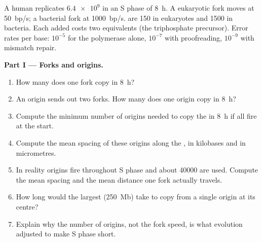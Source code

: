 \begin{problem}
\label{pb:b1:replication-mitosis:1}
A human  replicates $\num{6.4e9}$  in an S phase of
\qty{8}{h}. A eukaryotic fork moves at \qty{50}{bp/s}; a bacterial
fork at \qty{1000}{bp/s}.  are \qty{150}{}
 in eukaryotes and \qty{1500}{} in bacteria. Each
 added costs two  equivalents (the triphosphate
precursor). Error rates per base: $10^{-5}$ for the polymerase alone,
$10^{-7}$ with proofreading, $10^{-9}$ with mismatch repair.

\medskip
\noindent\textbf{Part I --- Forks and origins.}
\begin{enumerate}
  \item How many  does one fork copy in \qty{8}{h}?
  \item An origin sends out two forks. How many  does one
        origin copy in \qty{8}{h}?
  \item Compute the minimum number of origins needed to copy the
         in \qty{8}{h} if all fire at the start.
  \item Compute the mean spacing of these origins along the , in
        kilobases and in micrometres.
  \item In reality origins fire throughout S phase and about
        \num{40000} are used. Compute the mean spacing and the mean
        distance one fork actually travels.
  \item How long would the largest  (\qty{250}{Mb}) take to
        copy from a single origin at its centre?
  \item Explain why the number of origins, not the fork speed, is what
        evolution adjusted to make S phase short.
\end{enumerate}


\end{problem}
